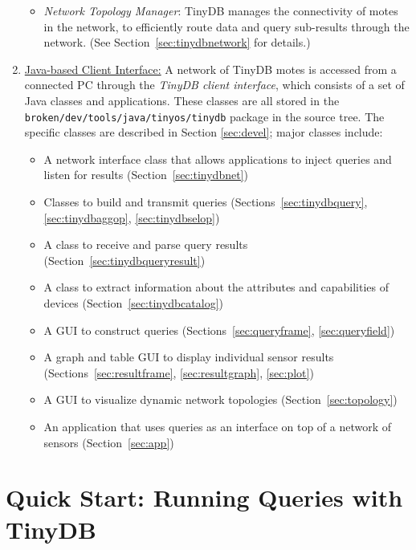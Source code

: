 \documentclass[11pt]{article}
\newcommand{\java}{broken/dev/tools/java}
\begin{document}
\begin{enumerate}
\begin{itemize}
\item {\it Network Topology Manager}: TinyDB manages the connectivity
  of motes in the network, to efficiently
  route data and query 
  sub-results through the network.  (See Section~\ref{sec:tinydbnetwork}
  for details.)
\end{itemize}
\item \underline{Java-based Client Interface:}
A network of TinyDB motes is accessed from a connected PC through the
{\em TinyDB client interface}, which consists
of a set of Java classes and applications.  These classes are all stored in the {\tt {\java}/tinyos/tinydb} 
package in the source tree.  The specific classes are described in Section \ref{sec:devel};  major
classes include:
\begin{itemize}
\item A network interface class that allows applications to inject queries and listen for results (Section~\ref{sec:tinydbnet}) 
\item Classes to build and transmit queries (Sections~\ref{sec:tinydbquery}, \ref{sec:tinydbaggop}, \ref{sec:tinydbselop})
\item A class to receive and parse query results (Section~\ref{sec:tinydbqueryresult})
\item A class to extract information about the attributes and capabilities of devices (Section~\ref{sec:tinydbcatalog})
\item A GUI to construct queries (Sections~\ref{sec:queryframe}, \ref{sec:queryfield})
\item A graph and table GUI to display individual sensor results (Sections~\ref{sec:resultframe}, \ref{sec:resultgraph}, \ref{sec:plot})
\item A GUI to visualize dynamic network topologies (Section~\ref{sec:topology})
\item An application that uses queries as an interface on top of a network of sensors (Section~\ref{sec:app})
\end{itemize}
\end{enumerate}

\section{Quick Start:  Running Queries with TinyDB} \label{sec:runningqueries}
\end{document}
